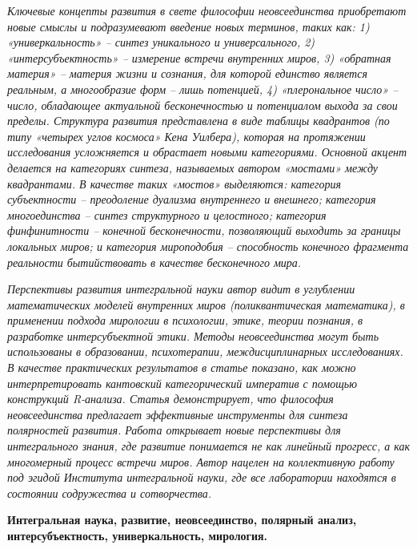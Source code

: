     \textit{Ключевые концепты развития в свете философии неовсеединства приобретают новые смыслы и подразумевают введение новых терминов, таких как: 1) «универкальность» – синтез уникального и универсального, 2) «интерсубъектность» – измерение встречи внутренних миров, 3) «обратная материя» – материя жизни и сознания, для которой единство является реальным, а многообразие форм – лишь потенцией, 4) «плерональное число» – число, обладающее актуальной бесконечностью и потенциалом выхода за свои пределы. Структура развития представлена в виде таблицы квадрантов (по типу «четырех углов космоса» Кена Уилбера), которая на протяжении исследования усложняется и обрастает новыми категориями. Основной акцент делается на категориях синтеза, называемых автором «мостами» между квадрантами. В качестве таких «мостов» выделяются: категория субъектности – преодоление дуализма внутреннего и внешнего; категория многоединства – синтез структурного и целостного; категория финфинитности – конечной бесконечности, позволяющий выходить за границы локальных миров; и категория мироподобия – способность конечного фрагмента реальности бытийствовать в качестве бесконечного мира.}

    \textit{Перспективы развития интегральной науки автор видит в углублении математических моделей внутренних миров (поликвантическая математика), в применении подхода мирологии в психологии, этике, теории познания, в разработке интерсубъектной этики. Методы неовсеединства могут быть использованы в образовании, психотерапии, междисциплинарных исследованиях. В качестве практических результатов в статье показано, как можно интерпретировать кантовский категорический императив с помощью конструкций R-анализа. Статья демонстрирует, что философия неовсеединства предлагает эффективные инструменты для синтеза полярностей развития. Работа открывает новые перспективы для интегрального знания, где развитие понимается не как линейный прогресс, а как многомерный процесс встречи миров. Автор нацелен на коллективную работу под эгидой Института интегральной науки, где все лаборатории находятся в состоянии содружества и сотворчества.}

    \textbf{Интегральная наука, развитие, неовсеединство, полярный анализ, интерсубъектность, универкальность, мирология.}

